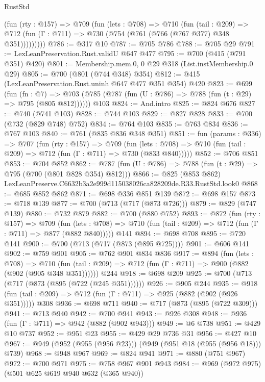 \begin{lexlean}{RustStd}
\begin{coremodule}
        (fun (rty : @157) =>
        @709
          (fun (lets : @708) =>
          @710
            (fun (tail : @209) =>
            @712 (fun (Γ : @711) => @730 (@754 (@761 (@766 (@767 @377) @348 @351)))))))))
@786 := @317 @10
@787 := @705 @786
@788 := @705 @29
@791 := LexLeanPreservation.Rust.validU @647 @477
@795 := @700 (@415 (@791 @351) @420)
@801 := Membership.mem.{0, 0} @29 @318 (List.instMembership.{0} @29)
@805 := @700 (@801 (@744 @348) @354)
@812 := @415 (LexLeanPreservation.Rust.uninh @647 @477 @351 @354) @420
@823 := @699
    (fun (fn : @7) =>
    @703 (@785 (@787 (fun (U : @786) => @788 (fun (t : @29) => @795 (@805 @812))))))
    @103
@824 := And.intro
@825 := @824 @676
@827 := @740 (@741 @103)
@828 := @744 @103
@829 := @827 @828
@833 := @700 (@732 (@829 @748) @752)
@834 := @764 @103
@835 := @763 @834
@836 := @767 @103
@840 := @761 (@835 @836 @348 @351)
@851 := fun (params : @336) =>
  @707
    (fun (rty : @157) =>
    @709
      (fun (lets : @708) => @710 (fun (tail : @209) => @712 (fun (Γ : @711) => @730 (@833 @840)))))
@852 := @706 @851
@853 := @704 @852
@862 := @787 (fun (U : @786) => @788 (fun (t : @29) => @795 (@700 (@801 @828 @354) @812)))
@866 := @825 (@853 @862) LexLeanPreserve.C6632b3a2e999d115038026ca828209de.R33.RustStd.look0
@868 := @685 @852 @862
@871 := @698 @336 @851 @139
@872 := @698 @157
@873 := @718 @139
@877 := @700 (@713 (@717 (@873 @726)))
@879 := @829 (@747 @139)
@880 := @732 @879
@882 := @700 (@880 @752)
@893 := @872
    (fun (rty : @157) =>
    @709
      (fun (lets : @708) => @710 (fun (tail : @209) => @712 (fun (Γ : @711) => @877 (@882 @840)))))
    @141
@894 := @698 @708
@895 := @720 @141
@900 := @700 (@713 (@717 (@873 (@895 @725))))
@901 := @606 @141
@902 := @759 @901
@905 := @762 @901 @834 @836
@917 := @894
    (fun (lets : @708) =>
    @710 (fun (tail : @209) => @712 (fun (Γ : @711) => @900 (@882 (@902 (@905 @348 @351))))))
    @244
@918 := @698 @209
@925 := @700 (@713 (@717 (@873 (@895 (@722 (@245 @351))))))
@926 := @905 @244
@935 := @918 (fun (tail : @209) => @712 (fun (Γ : @711) => @925 (@882 (@902 (@926 @351))))) @308
@936 := @698 @711
@940 := @717 (@873 (@895 (@722 @309)))
@941 := @713 @940
@942 := @700 @941
@943 := @926 @308
@948 := @936 (fun (Γ : @711) => @942 (@882 (@902 @943)))
@949 := @6 @738
@951 := @429 @10 @737
@952 := @951 @23
@955 := @429 @29 @736 @31
@956 := @427 @10
@967 := @949 (@952 (@955 (@956 @23))) (@949 (@951 @18 (@955 (@956 @18))) @739)
@968 := @948 @967
@969 := @824 @941
@971 := @880 (@751 @967)
@972 := @700 @971
@975 := @758 @967 @901 @943
@984 := @969 (@972 @975) (@501 @625 @619 @940 @632 (@365 @940))

\end{coremodule}
\end{lexlean}
